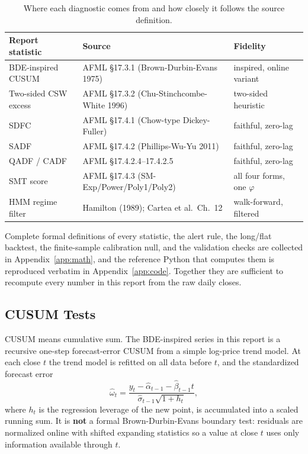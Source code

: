 \documentclass[11pt]{article}
\begin{document}
\begin{table}[H]
\centering
\small
\begin{tabular}{@{}lll@{}}
\toprule
Report statistic & Source & Fidelity \\
\midrule
BDE-inspired CUSUM & AFML \S17.3.1 (Brown-Durbin-Evans 1975) & inspired, online variant \\
Two-sided CSW excess & AFML \S17.3.2 (Chu-Stinchcombe-White 1996) & two-sided heuristic \\
SDFC & AFML \S17.4.1 (Chow-type Dickey-Fuller) & faithful, zero-lag \\
SADF & AFML \S17.4.2 (Phillips-Wu-Yu 2011) & faithful, zero-lag \\
QADF / CADF & AFML \S17.4.2.4--17.4.2.5 & faithful, zero-lag \\
SMT score & AFML \S17.4.3 (SM-Exp/Power/Poly1/Poly2) & all four forms, one $\varphi$ \\
HMM regime filter & Hamilton (1989); Cartea et al.\ Ch.~12 & walk-forward, filtered \\
\bottomrule
\end{tabular}
\caption{Where each diagnostic comes from and how closely it follows the source definition.}
\end{table}

Complete formal definitions of every statistic, the alert rule, the long/flat backtest, the finite-sample calibration null, and the validation checks are collected in Appendix~\ref{app:math}, and the reference Python that computes them is reproduced verbatim in Appendix~\ref{app:code}. Together they are sufficient to recompute every number in this report from the raw daily closes.

\subsection{CUSUM Tests}

CUSUM means cumulative sum. The BDE-inspired series in this report is a recursive one-step forecast-error CUSUM from a simple log-price trend model. At each close $t$ the trend model is refitted on all data before $t$, and the standardized forecast error
\[
    \hat\omega_t = \frac{y_t - \hat\alpha_{t-1} - \hat\beta_{t-1} t}{\hat\sigma_{t-1}\sqrt{1 + h_t}},
\]
where $h_t$ is the regression leverage of the new point, is accumulated into a scaled running sum. It is \textbf{not} a formal Brown-Durbin-Evans boundary test: residuals are normalized online with shifted expanding statistics so a value at close $t$ uses only information available through $t$.
\end{document}
